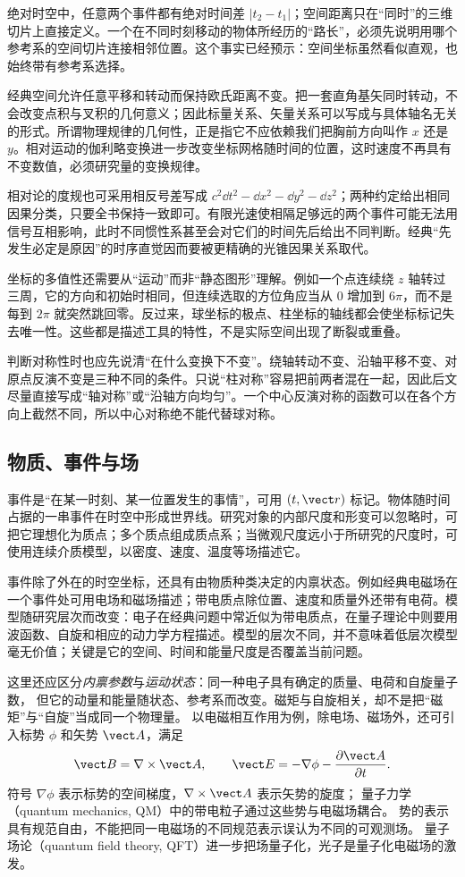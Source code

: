 绝对时空中，任意两个事件都有绝对时间差 $|t_2-t_1|$；空间距离只在“同时”的三维切片上直接定义。一个在不同时刻移动的物体所经历的“路长”，必须先说明用哪个参考系的空间切片连接相邻位置。这个事实已经预示：空间坐标虽然看似直观，也始终带有参考系选择。

经典空间允许任意平移和转动而保持欧氏距离不变。把一套直角基矢同时转动，不会改变点积与叉积的几何意义；因此标量关系、矢量关系可以写成与具体轴名无关的形式。所谓物理规律的几何性，正是指它不应依赖我们把胸前方向叫作 $x$ 还是 $y$。相对运动的伽利略变换进一步改变坐标网格随时间的位置，这时速度不再具有不变数值，必须研究量的变换规律。

相对论的度规也可采用相反号差写成
$c^2\dd t^2-\dd x^2-\dd y^2-\dd z^2$；两种约定给出相同因果分类，只要全书保持一致即可。有限光速使相隔足够远的两个事件可能无法用信号互相影响，此时不同惯性系甚至会对它们的时间先后给出不同判断。经典“先发生必定是原因”的时序直觉因而要被更精确的光锥因果关系取代。

坐标的多值性还需要从“运动”而非“静态图形”理解。例如一个点连续绕 $z$ 轴转过三周，它的方向和初始时相同，但连续选取的方位角应当从 $0$ 增加到 $6\pi$，而不是每到 $2\pi$ 就突然跳回零。反过来，球坐标的极点、柱坐标的轴线都会使坐标标记失去唯一性。这些都是描述工具的特性，不是实际空间出现了断裂或重叠。

判断对称性时也应先说清“在什么变换下不变”。绕轴转动不变、沿轴平移不变、对原点反演不变是三种不同的条件。只说“柱对称”容易把前两者混在一起，因此后文尽量直接写成“轴对称”或“沿轴方向均匀”。一个中心反演对称的函数可以在各个方向上截然不同，所以中心对称绝不能代替球对称。

\subsection{物质、事件与场}
\label{r2ch01:sec:matter}

事件是“在某一时刻、某一位置发生的事情”，可用 $(t,\vect r)$ 标记。物体随时间占据的一串事件在时空中形成世界线。研究对象的内部尺度和形变可以忽略时，可把它理想化为质点；多个质点组成质点系；当微观尺度远小于所研究的尺度时，可使用连续介质模型，以密度、速度、温度等场描述它。

事件除了外在的时空坐标，还具有由物质种类决定的内禀状态。例如经典电磁场在一个事件处可用电场和磁场描述；带电质点除位置、速度和质量外还带有电荷。模型随研究层次而改变：电子在经典问题中常近似为带电质点，在量子理论中则要用波函数、自旋和相应的动力学方程描述。模型的层次不同，并不意味着低层次模型毫无价值；关键是它的空间、时间和能量尺度是否覆盖当前问题。

这里还应区分\emph{内禀参数}与\emph{运动状态}：同一种电子具有确定的质量、电荷和自旋量子数，
但它的动量和能量随状态、参考系而改变。磁矩与自旋相关，却不是把“磁矩”与“自旋”当成同一个物理量。
以电磁相互作用为例，除电场、磁场外，还可引入标势 $\phi$ 和矢势 $\vect A$，满足
\[
  \vect B=\nabla\times\vect A,\qquad
  \vect E=-\nabla\phi-\frac{\partial\vect A}{\partial t}.
\]
符号 $\nabla\phi$ 表示标势的空间梯度，$\nabla\times\vect A$ 表示矢势的旋度；
量子力学（quantum mechanics, QM）中的带电粒子通过这些势与电磁场耦合。
势的表示具有规范自由，不能把同一电磁场的不同规范表示误认为不同的可观测场。
量子场论（quantum field theory, QFT）进一步把场量子化，光子是量子化电磁场的激发。

